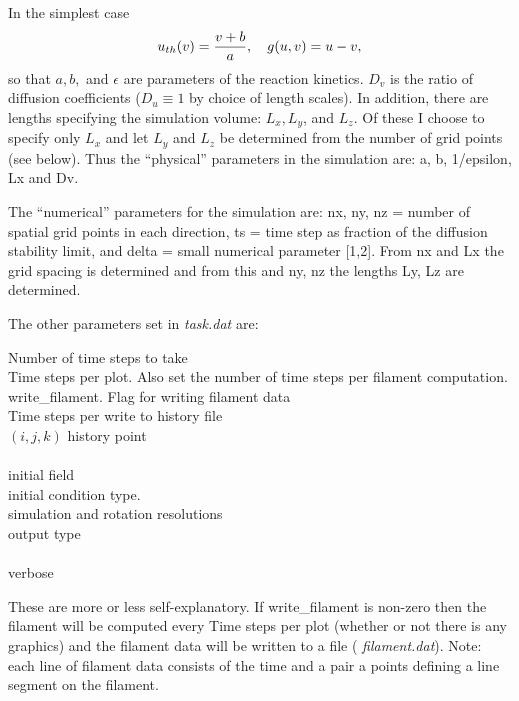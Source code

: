 In the simplest case
$$
u_{th}(v) = {{v+b}\over{a}}, ~~~
g(u,v) = u-v, 
$$ 
so that $a,b,$ and $\epsilon$ are parameters of the reaction kinetics.
$D_v$ is the ratio of diffusion coefficients ($D_u \equiv 1$ by choice
of length scales). In addition, there are lengths specifying the
simulation volume: $L_x, L_y$, and $L_z$.  Of these I choose to
specify only $L_x$ and let $L_y$ and $L_z$ be determined from the
number of grid points (see below).  Thus the ``physical'' parameters
in the simulation are: {\sf a, b, 1/epsilon, Lx} and {\sf Dv}.

The ``numerical'' parameters for the simulation are: {\sf nx, ny, nz}
= number of spatial grid points in each direction, {\sf ts} = time
step as fraction of the diffusion stability limit, and {\sf delta} =
small numerical parameter [1,2].  From {\sf nx} and {\sf Lx} the grid
spacing is determined and from this and {\sf ny, nz} the lengths {\sf
Ly, Lz} are determined.

The other parameters set in
{\em task.dat} are:

\begin{list}{dummy}
{\partopsep=-10pt\parsep=-10pt\itemsep=0pt}
\item[~]{\sf Number of time steps to take} \\
        {\sf Time steps per plot.} Also set the number of time
        steps per filament computation. \\
        {\sf write\_filament.} Flag for writing filament data \\
        {\sf Time steps per write to history file} \\
        $(i,j, k)$ {\sf history point} \\ 
	\\
	{\sf initial field} \\
	{\sf initial condition type.}  \\
	{\sf simulation and rotation resolutions} \\
	{\sf output type} \\
	\\
	{\sf verbose} 
\end{list}

These are more or less self-explanatory.  
If {\sf write\_filament} is non-zero then the filament will be
computed every {\sf Time steps per plot} (whether or not there is any
graphics) and the filament data will be written to a file ({\em
filament.dat}).  Note: each line of filament data consists of the
time and a pair a points defining a line segment on the filament. 


